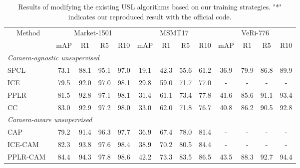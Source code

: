 \begin{table}[t]
    \scriptsize
    \caption{
        Results of modifying the existing USL algorithms based on our training strategies.
        "*" indicates our reproduced result with the official code.
    }
    \label{tab:main_usl}
    \vspace{-3pt}
    \setlength{\tabcolsep}{0.72em}
    \centering
    {
    \renewcommand{\arraystretch}{1.1}
    \begin{tabular}{l|cccc|cccc|cccc}
        \hline
        \multicolumn{1}{c|}{\multirow{2}{*}{Method}} & 
        \multicolumn{4}{c|}{Market-1501} & 
        \multicolumn{4}{c|}{MSMT17} & 
        \multicolumn{4}{c}{VeRi-776} \\
        
        \cline{2-13}
        \multicolumn{1}{c|}{} & 
        mAP & R1 & R5 & R10 & mAP & R1 & R5 & R10 & mAP & R1 & R5 & R10 \\ 
        \hline \hline
        											
        \multicolumn{13}{l}{\it Camera-agnostic unsupervised} \\
        \hline
        SPCL~\citep{ge2020self} & 73.1 & 88.1 & 95.1 & 97.0 & 19.1 & 42.3 & 55.6 & 61.2 & 36.9 & 79.9 & 86.8 & 89.9 \\
        ICE~\citep{chen2021ice} & 79.5 & 92.0 & 97.0 & 98.1 & 29.8 & 59.0 & 71.7 & 77.0 & - & - & - & - \\
        PPLR~\citep{cho2022part} & 81.5 & 92.8 & 97.1 & 98.1 & 31.4 & 61.1 & 73.4 & 77.8 & 41.6	& 85.6 & 91.1 & 93.4 \\
        CC~\citep{dai2022cluster} & 83.0 & 92.9	& 97.2 & 98.0 & 33.0 & 62.0 & 71.8 & 76.7 & 40.8 & 86.2 & 90.5 & 92.8 \\
        \hline

    
        

        \multicolumn{13}{l}{\it Camera-aware unsupervised} \\
        \hline
        CAP~\citep{wang2021camera} & 79.2 & 91.4 & 96.3 & 97.7 & 36.9 & 67.4 & 78.0 & 81.4 & - & - & - & - \\
        ICE-CAM~\citep{chen2021ice} & 82.3 & 93.8 & 97.6&98.4&38.9&70.2&80.5&84.4& - & - & - & -  \\
        PPLR-CAM~\citep{cho2022part} & 84.4 & 94.3 & 97.8 & 98.6 & 42.2 & 73.3&83.5&86.5&43.5&88.3&92.7&94.4 \\
        \hline
        \hline


\end{tabular}}
\end{table}
